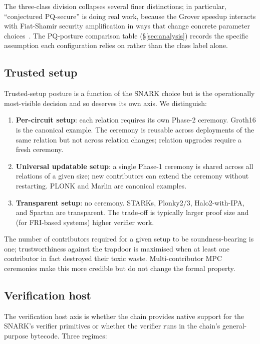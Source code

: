The three-class division collapses several finer distinctions; in
particular, ``conjectured PQ-secure'' is doing real work, because the
Grover speedup interacts with Fiat-Shamir security amplification in
ways that change concrete parameter choices~\cite{don-2019-fiat-shamir}.
The PQ-posture comparison table (\S\ref{sec:analysis}) records the
specific assumption each configuration relies on rather than the
class label alone.

\subsection{Trusted setup}
\label{sec:dim-setup}

Trusted-setup posture is a function of the SNARK choice but is the
operationally most-visible decision and so deserves its own axis. We
distinguish:
\begin{enumerate}
  \item \textbf{Per-circuit setup}: each relation requires its own
    Phase-2 ceremony. Groth16 is the canonical example. The ceremony
    is reusable across deployments of the same relation but not across
    relation changes; relation upgrades require a fresh ceremony.
  \item \textbf{Universal updatable setup}: a single Phase-1 ceremony
    is shared across all relations of a given size; new contributors
    can extend the ceremony without restarting. PLONK and Marlin are
    canonical examples.
  \item \textbf{Transparent setup}: no ceremony. STARKs, Plonky2/3,
    Halo2-with-IPA, and Spartan are transparent. The trade-off is
    typically larger proof size and (for FRI-based systems) higher
    verifier work.
\end{enumerate}
The number of contributors required for a given setup to be
soundness-bearing is one; trustworthiness against the trapdoor is
maximised when at least one contributor in fact destroyed their
toxic waste. Multi-contributor MPC ceremonies make this more credible
but do not change the formal property.

\subsection{Verification host}
\label{sec:dim-host}

The verification host axis is whether the chain provides native
support for the SNARK's verifier primitives or whether the verifier
runs in the chain's general-purpose bytecode. Three regimes:

